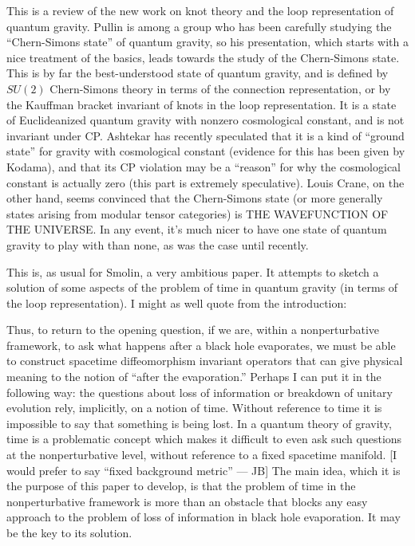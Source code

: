 \documentclass{article}
\def\tightlist{}
\renewcommand{\texttt}[1]{%
  \begingroup
  \ttfamily
  \begingroup\lccode`~=`/\lowercase{\endgroup\def~}{/\discretionary{}{}{}}%
  \begingroup\lccode`~=`[\lowercase{\endgroup\def~}{[\discretionary{}{}{}}%
  \begingroup\lccode`~=`.\lowercase{\endgroup\def~}{.\discretionary{}{}{}}%
  \catcode`/=\active\catcode`[=\active\catcode`.=\active
  \scantokens{#1\noexpand}%
  \endgroup
}
\begin{document}
This is a review of the new work on knot theory and the loop
representation of quantum gravity. Pullin is among a group who has been
carefully studying the ``Chern-Simons state'' of quantum gravity, so his
presentation, which starts with a nice treatment of the basics, leads
towards the study of the Chern-Simons state. This is by far the
best-understood state of quantum gravity, and is defined by \(SU(2)\)
Chern-Simons theory in terms of the connection representation, or by the
Kauffman bracket invariant of knots in the loop representation. It is a
state of Euclideanized quantum gravity with nonzero cosmological
constant, and is not invariant under CP. Ashtekar has recently
speculated that it is a kind of ``ground state'' for gravity with
cosmological constant (evidence for this has been given by Kodama), and
that its CP violation may be a ``reason'' for why the cosmological
constant is actually zero (this part is extremely speculative). Louis
Crane, on the other hand, seems convinced that the Chern-Simons state
(or more generally states arising from modular tensor categories) is THE
WAVEFUNCTION OF THE UNIVERSE. In any event, it's much nicer to have one
state of quantum gravity to play with than none, as was the case until
recently.


This is, as usual for Smolin, a very ambitious paper. It attempts to
sketch a solution of some aspects of the problem of time in quantum
gravity (in terms of the loop representation). I might as well quote
from the introduction:

Thus, to return to the opening question, if we are, within a
nonperturbative framework, to ask what happens after a black hole
evaporates, we must be able to construct spacetime diffeomorphism
invariant operators that can give physical meaning to the notion of
``after the evaporation.'' Perhaps I can put it in the following way:
the questions about loss of information or breakdown of unitary
evolution rely, implicitly, on a notion of time. Without reference to
time it is impossible to say that something is being lost. In a quantum
theory of gravity, time is a problematic concept which makes it
difficult to even ask such questions at the nonperturbative level,
without reference to a fixed spacetime manifold. {[}I would prefer to
say ``fixed background metric'' --- JB{]} The main idea, which it is the
purpose of this paper to develop, is that the problem of time in the
nonperturbative framework is more than an obstacle that blocks any easy
approach to the problem of loss of information in black hole
evaporation. It may be the key to its solution.
\end{document}
